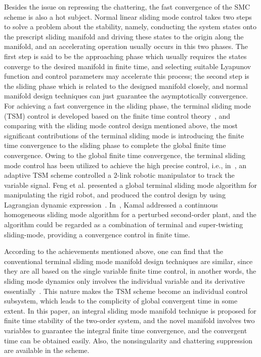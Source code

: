 \documentclass[3p]{elsarticle}
\theoremstyle{plain}
\theoremstyle{remark}
\begin{document}
Besides the issue on repressing the chattering, the fast convergence of the SMC scheme is also a hot subject. Normal linear sliding mode control takes two steps to solve a problem about the stability, namely, conducting the system states onto the prescript sliding manifold and driving these states to the origin along the manifold, and an accelerating operation usually occurs in this two phases. The first step is said to be the approaching phase which usually requires the states converge to the desired manifold in finite time, and selecting suitable Lyapunov function and control parameters may accelerate this process; the second step is the sliding phase which is related to the designed manifold closely, and normal manifold design techniques can just guarantee the asymptotically convergence. For achieving a fast convergence in the sliding phase, the terminal sliding mode (TSM) control is developed based on the finite time control theory~\cite{haimo1986finite,bhat1997finite}, and comparing with the sliding mode control design mentioned above, the most significant contributions of the terminal sliding mode is introducing the finite time convergence to the sliding phase to complete the global finite time convergence. Owing to the global finite time convergence, the terminal sliding mode control has been utilized to achieve the high precise control, i.e., in~\cite{li2015robust}, an adaptive TSM scheme controlled a $2$-link robotic manipulator to track the variable signal. Feng et al. presented a global terminal sliding mode algorithm for manipulating the rigid robot, and produced the control design by using Lagrangian dynamic expression~\cite{feng2002non}. In~\cite{kamal2016continuous}, Kamal addressed a continuous homogeneous sliding mode algorithm for a perturbed second-order plant, and the algorithm could be regarded as a combination of terminal and super-twisting sliding-mode, providing a convergence control in finite time. \par
According to the achievements mentioned above, one can find that the conventional terminal sliding mode manifold design techniques are similar, since they are all based on the single variable finite time control, in another words, the sliding mode dynamics only involves the individual variable and its derivative essentially~\cite{mu2016switching}. This nature makes the TSM scheme become an individual control subsystem, which leads to the complicity of global convergent time in some extent. In this paper, an integral sliding mode manifold technique is proposed for finite time stability of the two-order system, and the novel manifold involves two variables to guarantee the integral finite time convergence, and the convergent time can be obtained easily. Also, the nonsingularity and chattering suppression are available in the scheme. \par
\end{document}
